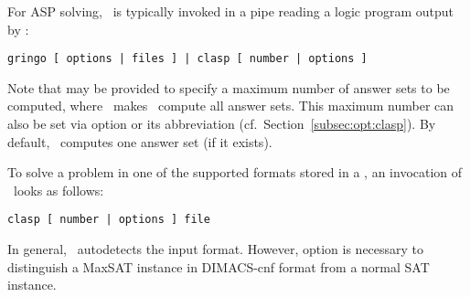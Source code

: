 For ASP solving,
\clasp\ is typically invoked in a pipe reading
a logic program output by \gringo:
%
\begin{lstlisting}[numbers=none]
gringo [ options | files ] | clasp [ number | options ]
\end{lstlisting}
%
Note that  may be provided to specify a maximum number of answer sets
to be computed, where~ makes \clasp\ compute all answer sets.
This maximum number can also be set via
option  or its abbreviation 
(cf.\ Section~\ref{subsec:opt:clasp}).
By default, \clasp\ computes one answer set (if it exists).

To solve a problem in one of the supported formats stored in a ,
an invocation of \clasp\ looks as follows:%
\begin{lstlisting}[numbers=none]
clasp [ number | options ] file
\end{lstlisting}
In general, \clasp\ autodetects the input format. However,
option  is necessary to distinguish a
MaxSAT instance in DIMACS-cnf format from a normal SAT instance.

